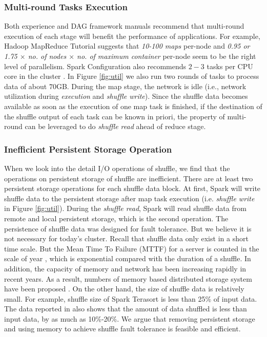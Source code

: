 \subsubsection{Multi-round Tasks Execution}\label{multi}
Both experience and DAG framework manuals recommend that multi-round execution of each stage will benefit the performance of applications.
For example, Hadoop MapReduce Tutorial  \cite{hadooptutorial} suggests that \textit{10-100 maps} per-node and \textit{0.95 or 1.75 $\times$ no. of nodes $\times$ no. of maximum container} per-node seem to be the right level of parallelism. Spark Configuration also recommends $2-3$ tasks per CPU core in the cluster \cite{sparkconf}.
In Figure \ref{fig:util} we also run two rounds of tasks to process data of about $70$GB. During the map stage, the network is idle (i.e., network utilization during \textit{execution} and \textit{shuffle write}). Since the shuffle data becomes available as soon as the execution of one map task is finished, if the destination of the shuffle output of each task can be known in priori, the property of multi-round can be leveraged to do \textit{shuffle read} ahead of reduce stage.


\subsubsection{Inefficient Persistent Storage Operation}
When we look into the detail I/O operations of shuffle, we find that the operations on persistent storage of shuffle are inefficient. There are at least two persistent storage operations for each shuffle data block. At first, Spark will write shuffle data to the persistent storage after map task execution (i.e. \textit{shuffle write} in Figure \ref{fig:util}). During the \textit{shuffle read}, Spark will read shuffle data from remote and local persistent storage, which is the second operation. The persistence of shuffle data was designed for fault tolerance. But we believe it is not necessary for today's cluster. Recall that shuffle data only exist in a short time scale. But the Mean Time To Failure (MTTF) for a server is counted in the scale of year \cite{tachyon}, which is exponential compared with the duration of a shuffle. In addition, the capacity of memory and network has been increasing rapidly in recent years. As a result, numbers of memory based distributed storage system have been proposed \cite{memcached, tachyon, ramcloud}. On the other hand, the size of shuffle data is relatively small. For example, shuffle size of Spark Terasort \cite{spark-tera} is less than 25\% of input data. The data reported in  \cite{makingsense} also shows that the amount of data shuffled is less than input data, by as much as 10\%-20\%. We argue that removing persistent storage and using memory to achieve shuffle fault tolerance is feasible and efficient.

